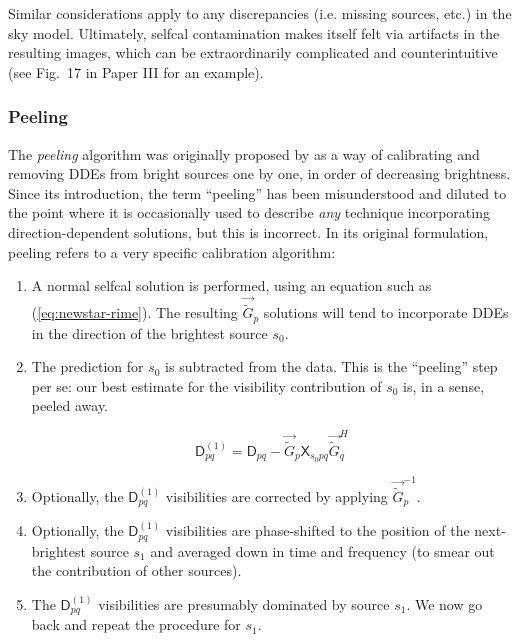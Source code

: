 \documentclass[referee]{aa}
\newcommand{\herm}{H}
\newcommand{\jones}[2]{\vec {#1}_{#2}}
\newcommand{\jonesinv}[2]{\vec {#1}^{-1}_{#2}}
\newcommand{\jonesT}[2]{\vec {#1}^{\herm}_{#2}}
\newcommand{\coh}[2]{\mathsf{{#1}}_{{#2}}}
\begin{document}
Similar considerations apply to any discrepancies (i.e. missing sources, etc.) in the sky model. Ultimately, selfcal contamination makes itself felt via artifacts in the resulting images, which can be extraordinarily complicated and counterintuitive (see Fig.~17 in Paper III for an example).

\subsubsection{Peeling\label{sec:peeling}}

The \emph{peeling} algorithm was originally proposed by \citet{JEN:peeling} as a way of calibrating and removing DDEs from bright sources one by one, in order of decreasing brightness. Since its introduction, the term ``peeling'' has been misunderstood and diluted to the point where it is occasionally used to describe {\em any} technique incorporating direction-dependent solutions, but this is incorrect. In its original formulation, peeling refers to a very specific calibration algorithm:

\begin{enumerate}

\item A normal selfcal solution is performed, using an equation such as (\ref{eq:newstar-rime}). The resulting $\jones{\tilde{G}}{p}$ solutions will tend to incorporate DDEs in the direction of the brightest source $s_0$.

\item The prediction for $s_0$ is subtracted from the data. This is the ``peeling'' step per se: our best estimate for the visibility contribution of $s_0$ is, in a sense, peeled away.

\[
\coh{D}{pq}^{(1)} = \coh{D}{pq} - \jones{\tilde{G}}{p} \coh{X}{s_0 pq} \jonesT{\tilde{G}}{q}
\]

\item Optionally, the $\coh{D}{pq}^{(1)}$ visibilities are corrected by applying $\jonesinv{\tilde{G}}{p}$.

\item Optionally, the $\coh{D}{pq}^{(1)}$ visibilities are phase-shifted to the position of the next-brightest source $s_1$ and averaged down in time and frequency (to smear out the contribution of other sources).
 
\item The $\coh{D}{pq}^{(1)}$ visibilities are presumably dominated by source $s_1$. We now go back and repeat the procedure for $s_1$.

\end{enumerate}
\end{document}
